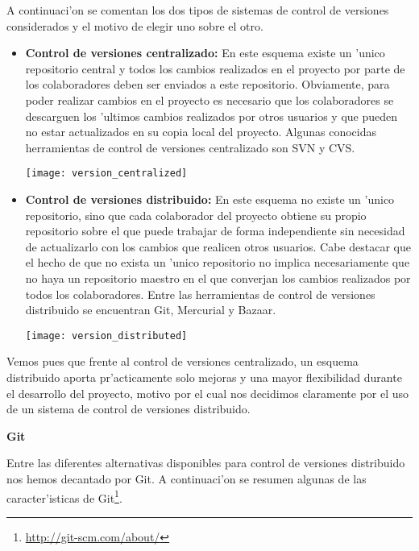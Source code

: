 A continuaci'on se comentan los dos tipos de sistemas de control de versiones\cite{versioncontrol} considerados y el
motivo de elegir uno sobre el otro.

\begin{itemize}
\item \textbf{Control de versiones centralizado:} En este esquema existe un 'unico repositorio central y todos los
cambios realizados en el proyecto por parte de los colaboradores deben ser enviados a este repositorio. Obviamente,
para poder realizar cambios en el proyecto es necesario que los colaboradores se descarguen los 'ultimos cambios
realizados por otros usuarios y que pueden no estar actualizados en su copia local del proyecto.
Algunas conocidas herramientas de control de versiones centralizado son SVN y CVS.

\begin{center}
\texttt{[image: version\_centralized]}
\end{center}

\item \textbf{Control de versiones distribuido:} En este esquema no existe un 'unico repositorio, sino que cada
colaborador del proyecto obtiene su propio repositorio sobre el que puede trabajar de forma independiente sin
necesidad de actualizarlo con los cambios que realicen otros usuarios. Cabe destacar que el hecho de que no exista
un 'unico repositorio no implica necesariamente que no haya un repositorio maestro en el que converjan los cambios
realizados por todos los colaboradores.
Entre las herramientas de control de versiones distribuido se encuentran Git, Mercurial y Bazaar.

\begin{center}
\texttt{[image: version\_distributed]}
\end{center}

\end{itemize}

Vemos pues que frente al control de versiones centralizado, un esquema distribuido aporta pr'acticamente solo mejoras
y una mayor flexibilidad durante el desarrollo del proyecto, motivo por el cual nos decidimos claramente por el uso
de un sistema de control de versiones distribuido.

\textbf{Git}

Entre las diferentes alternativas disponibles para control de versiones distribuido nos hemos decantado por Git.
A continuaci'on se resumen algunas de las caracter'isticas de Git\footnote{\url{http://git-scm.com/about/}}.

